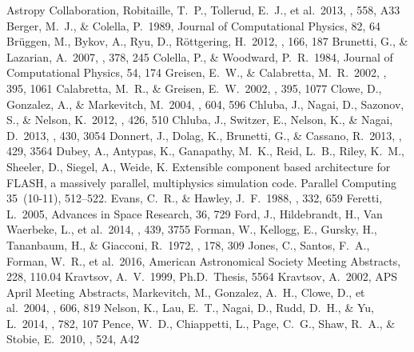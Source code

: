 \documentclass{emulateapj}
\begin{document}
\begin{thebibliography}{}
 Astropy Collaboration, Robitaille, T.~P., Tollerud, E.~J., et al.\ 2013, \aap, 558, A33
 Berger, M.~J., \& Colella, P.\ 1989, Journal of Computational Physics, 82, 64
 Br{\"u}ggen, M., Bykov, A., Ryu, D., R{\"o}ttgering, H.\ 2012, \ssr, 166, 187
 Brunetti, G., \& Lazarian, A.\ 2007, \mnras, 378, 245
 Colella, P., \& Woodward, P.~R.\ 1984, Journal of Computational Physics, 54, 174
 Greisen, E.~W., \& Calabretta, M.~R.\ 2002, \aap, 395, 1061
 Calabretta, M.~R., \& Greisen, E.~W.\ 2002, \aap, 395, 1077
 Clowe, D., Gonzalez, A., \& Markevitch, M.\ 2004, \apj, 604, 596
 Chluba, J., Nagai, D., Sazonov, S., \& Nelson, K.\ 2012, \mnras, 426, 510
 Chluba, J., Switzer, E., Nelson, K., \& Nagai, D.\ 2013, \mnras, 430, 3054
 Donnert, J., Dolag, K., Brunetti, G., \& Cassano, R.\ 2013, \mnras, 429, 3564
 {Dubey}, A., {Antypas}, K.,
  {Ganapathy}, M.~K., {Reid}, L.~B., {Riley}, K.~M., {Sheeler}, D.,
  {Siegel}, A., {Weide}, K. Extensible component based architecture
  for FLASH, a massively parallel, multiphysics simulation
  code. Parallel Computing 35~(10-11), 512--522.
 Evans, C.~R., \& Hawley, J.~F.\ 1988, \apj, 332, 659
 Feretti, L.\ 2005, Advances in Space Research, 36, 729
 Ford, J., Hildebrandt, H., Van Waerbeke, L., et al.\ 2014, \mnras, 439, 3755
 Forman, W., Kellogg, E., Gursky, H., Tananbaum, H., \& Giacconi, R.\ 1972, \apj, 178, 309
 Jones, C., Santos, F.~A., Forman, W.~R., et al.\ 2016, American Astronomical Society Meeting Abstracts, 228, 110.04 
 Kravtsov, A.~V.\ 1999, Ph.D.~Thesis, 5564 
 Kravtsov, A.\ 2002, APS April Meeting Abstracts,  
 Markevitch, M., Gonzalez, A.~H., Clowe, D., et al.\ 2004, \apj, 606, 819
 Nelson, K., Lau, E.~T., Nagai, D., Rudd, D.~H., \& Yu, L.\ 2014, \apj, 782, 107 
 Pence, W.~D., Chiappetti, L., Page, C.~G., Shaw, R.~A., \& Stobie, E.\ 2010, \aap, 524, A42

\end{thebibliography}
\end{document}
